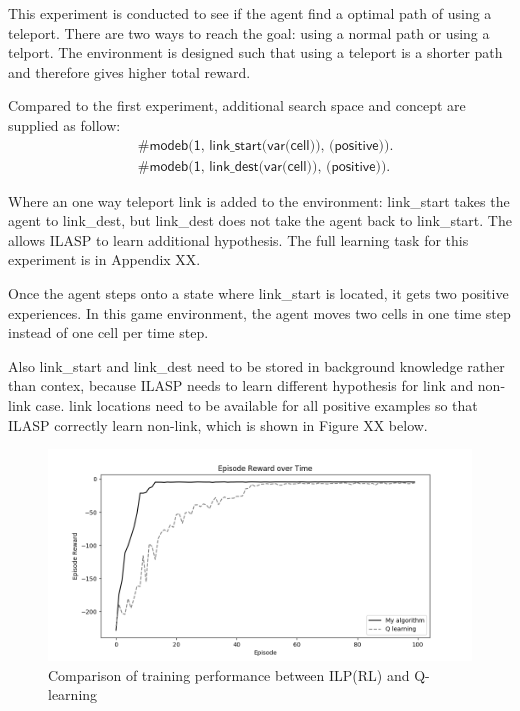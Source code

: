 This experiment is conducted to see if the agent find a optimal path of using a teleport.
There are two ways to reach the goal: using a normal path or using a telport. 
The environment is designed such that using a teleport is a shorter path and therefore gives higher total reward. 

Compared to the first experiment, additional search space and concept are supplied as follow:
\begin{equation*}
\begin{split}
&\textsf{\#modeb(1, link\_start(var(cell)), (positive)).}\\
&\textsf{\#modeb(1, link\_dest(var(cell)), (positive)).}
\end{split}
\end{equation*}

Where an one way teleport link is added to the environment: link\_start takes the agent to link\_dest, but link\_dest does not take the agent back to link\_start.
The allows ILASP to learn additional hypothesis.
The full learning task for this experiment is in Appendix XX.

Once the agent steps onto a state where link\_start is located, it gets two positive experiences. 
In this game environment, the agent moves two cells in one time step instead of one cell per time step.


Also link\_start and link\_dest need to be stored in background knowledge rather than contex, 
because ILASP needs to learn different hypothesis for link and non-link case. 
link locations need to be available for all positive examples so that ILASP correctly learn non-link, which is shown in Figure XX below.

\begin{figure}[!htb]
\centering
\includegraphics[width=1.0\textwidth]{./figures/experiment3_training}
\caption{Comparison of training performance between ILP(RL) and Q-learning}
\label{experiment3_training}
\end{figure}

